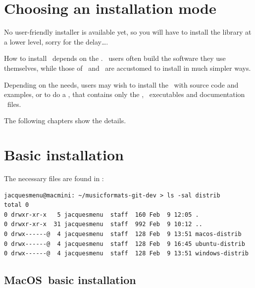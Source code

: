 
\chapter{Choosing an installation mode}

No user-friendly installer is available yet, so you will have to install the library at a lower level, sorry for the delay\dots.

How to install \mf\ depends on the \OS. \Linux\ users often build the software they use themselves, while those of \Windows\ and \MacOS\ are accustomed to install in much simpler ways.

Depending on the needs, users may wish to install the  \mf\ with source code and examples, or to do a , that contains only the , \CLI\ executables and documentation \pdf\ files.

The following chapters show the details.


\chapter{Basic installation}

The necessary files are found in :
\begin{lstlisting}[language=Terminal]
jacquesmenu@macmini: ~/musicformats-git-dev > ls -sal distrib
total 0
0 drwxr-xr-x   5 jacquesmenu  staff  160 Feb  9 12:05 .
0 drwxr-xr-x  31 jacquesmenu  staff  992 Feb  9 10:12 ..
0 drwx------@  4 jacquesmenu  staff  128 Feb  9 13:51 macos-distrib
0 drwx------@  4 jacquesmenu  staff  128 Feb  9 16:45 ubuntu-distrib
0 drwx------@  4 jacquesmenu  staff  128 Feb  9 13:51 windows-distrib
\end{lstlisting}

\section{MacOS\texttrademark\ basic installation}

